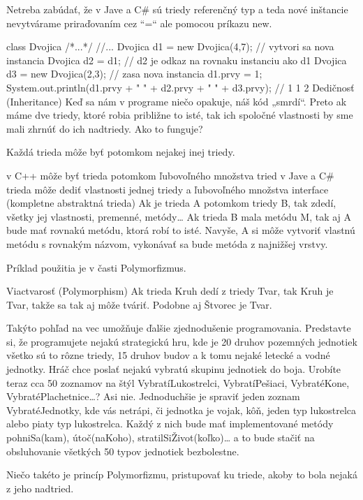 Netreba zabúdať, že v Jave a C\# sú triedy referenčný typ a teda nové inštancie nevytvárame priraďovaním cez “=“ ale pomocou príkazu new.

class Dvojica { /*...*/ }
//...
{
    Dvojica d1 = new Dvojica(4,7);  // vytvori sa nova instancia
    Dvojica d2 = d1;                // d2 je odkaz na rovnaku instanciu ako d1
    Dvojica d3 = new Dvojica(2,3);  // zasa nova instancia
    d1.prvy = 1;
    System.out.println(d1.prvy + " " + d2.prvy + " " + d3.prvy);
    // 1 1 2
}
Dedičnosť (Inheritance)
Keď sa nám v programe niečo opakuje, náš kód „smrdí“. Preto ak máme dve triedy, ktoré robia približne to isté, tak ich spoločné vlastnosti by sme mali zhrnúť do ich nadtriedy. Ako to funguje?

Každá trieda môže byť potomkom nejakej inej triedy.

v C++ môže byť trieda potomkom ľubovoľného množstva tried
v Jave a C\# trieda môže dediť vlastnosti jednej triedy a ľubovoľného množstva interface (kompletne abstraktná trieda)
Ak je trieda A potomkom triedy B, tak zdedí, všetky jej vlastnosti, premenné, metódy… Ak trieda B mala metódu M, tak aj A bude mať rovnakú metódu, ktorá robí to isté. Navyše, A si môže vytvoriť vlastnú metódu s rovnakým názvom, vykonávať sa bude metóda z najnižšej vrstvy.

Príklad použitia je v časti Polymorfizmus.

Viactvarosť (Polymorphism)
Ak trieda Kruh dedí z triedy Tvar, tak Kruh je Tvar, takže sa tak aj môže tváriť. Podobne aj Štvorec je Tvar.

Takýto pohľad na vec umožňuje ďalšie zjednodušenie programovania. Predstavte si, že programujete nejakú strategickú hru, kde je 20 druhov pozemných jednotiek všetko sú to rôzne triedy, 15 druhov budov a k tomu nejaké letecké a vodné jednotky. Hráč chce poslať nejakú vybratú skupinu jednotiek do boja. Urobíte teraz cca 50 zoznamov na štýl VybratíLukostrelci, VybratíPešiaci, VybratéKone, VybratéPlachetnice…? Asi nie. Jednoduchšie je spraviť jeden zoznam VybratéJednotky, kde vás netrápi, či jednotka je vojak, kôň, jeden typ lukostrelca alebo piaty typ lukostrelca. Každý z nich bude mať implementované metódy pohniSa(kam), útoč(naKoho), stratilSiŽivot(koľko)… a to bude stačiť na obsluhovanie všetkých 50 typov jednotiek bezbolestne.

Niečo takéto je princíp Polymorfizmu, pristupovať ku triede, akoby to bola nejaká z jeho nadtried.





